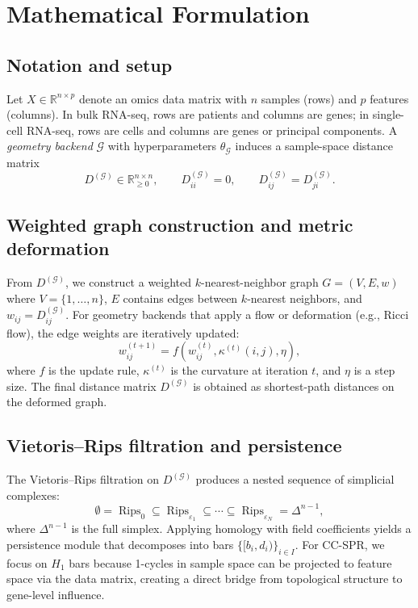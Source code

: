 \documentclass[11pt]{article}
\DeclareMathOperator{\Rips}{Rips}
\begin{document}
\section{Mathematical Formulation}
\label{sec:math}

\subsection{Notation and setup}

Let $X \in \mathbb{R}^{n \times p}$ denote an omics data matrix with $n$ samples (rows) and $p$ features (columns).
In bulk RNA-seq, rows are patients and columns are genes; in single-cell RNA-seq, rows are cells and columns are genes or principal components.
A \emph{geometry backend} $\mathcal{G}$ with hyperparameters $\theta_{\mathcal{G}}$ induces a sample-space distance matrix
\[
D^{(\mathcal{G})} \in \mathbb{R}_{\ge 0}^{n \times n}, \qquad D^{(\mathcal{G})}_{ii}=0, \qquad D^{(\mathcal{G})}_{ij} = D^{(\mathcal{G})}_{ji}.
\]

\subsection{Weighted graph construction and metric deformation}

From $D^{(\mathcal{G})}$, we construct a weighted $k$-nearest-neighbor graph $G = (V, E, w)$ where $V = \{1, \ldots, n\}$, $E$ contains edges between $k$-nearest neighbors, and $w_{ij} = D^{(\mathcal{G})}_{ij}$.
For geometry backends that apply a flow or deformation (e.g., Ricci flow), the edge weights are iteratively updated:
\[
w_{ij}^{(t+1)} = f(w_{ij}^{(t)}, \kappa^{(t)}(i,j), \eta),
\]
where $f$ is the update rule, $\kappa^{(t)}$ is the curvature at iteration $t$, and $\eta$ is a step size.
The final distance matrix $D^{(\mathcal{G})}$ is obtained as shortest-path distances on the deformed graph.

\subsection{Vietoris--Rips filtration and persistence}

The Vietoris--Rips filtration on $D^{(\mathcal{G})}$ produces a nested sequence of simplicial complexes:
\[
\emptyset = \Rips_0 \subseteq \Rips_{\varepsilon_1} \subseteq \cdots \subseteq \Rips_{\varepsilon_N} = \Delta^{n-1},
\]
where $\Delta^{n-1}$ is the full simplex.
Applying homology with field coefficients yields a persistence module that decomposes into bars $\{[b_i, d_i)\}_{i \in I}$.
For CC-SPR, we focus on $H_1$ bars because 1-cycles in sample space can be projected to feature space via the data matrix, creating a direct bridge from topological structure to gene-level influence.
\end{document}
